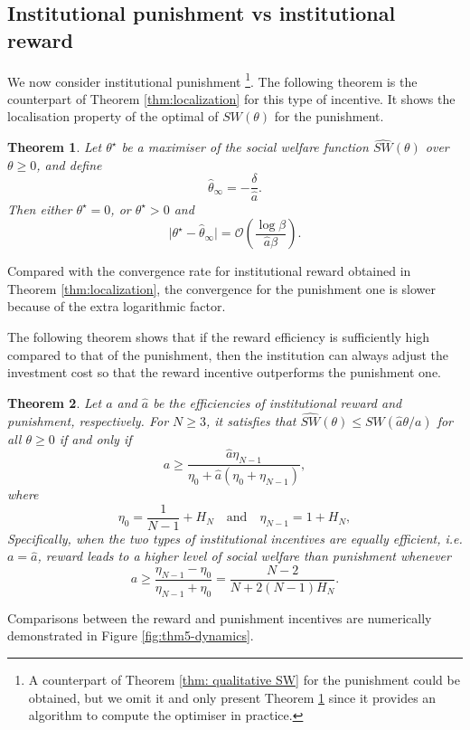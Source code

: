 \documentclass{article}
\newtheorem{theorem}{Theorem}
\begin{document}
\subsection{Institutional punishment vs institutional reward}
We now consider institutional punishment \footnote{A counterpart of Theorem \ref{thm: qualitative SW} for the punishment could be obtained, but we omit it and only present Theorem \ref{thm:localization_p} since it provides an algorithm to compute the optimiser in practice.}.
The following theorem is the counterpart of Theorem \ref{thm:localization} for this type of incentive. It shows the localisation property of the optimal of $SW(\theta)$ for the punishment.
\begin{theorem}
\label{thm:localization_p}
Let $\theta^\star$ be a maximiser of the social welfare function  $\widehat{SW}(\theta)$ over $\theta \ge 0$, and define
\[
\hat{\theta}_\infty = -\frac{\delta}{\hat{a}}.
\]
Then either $\theta^\star = 0$, or $\theta^\star>0$ and
\[
\bigl|\theta^\star - \hat{\theta}_\infty\bigr| = \mathcal{O}\!\left(\frac{\log \beta}{\hat{a}\beta}\right).
\]
\end{theorem}
Compared with the convergence rate for institutional  reward  obtained in Theorem \ref{thm:localization}, the convergence for the punishment one is  slower because of the extra logarithmic factor.

The following theorem shows that if the reward efficiency is sufficiently high compared to that of the punishment, then the institution can always adjust the investment cost so that the reward incentive outperforms the punishment one.\\

\begin{theorem} \label{thm:eff}
Let $a$ and $\hat{a}$ be the efficiencies of  institutional reward and punishment, respectively. For $N \ge 3$, it satisfies that $\widehat{SW}(\theta) \le SW(\hat{a}\theta/a)$ for all $\theta \ge 0$ if and only if 
\[
a \ge \frac{\hat{a} \eta_{N-1}}{\eta_0 + \hat{a}(\eta_0 + \eta_{N-1})},
\]
where 
\[
\eta_0 = \frac{1}{N-1} + H_{N}\quad \text{and}\quad
    \eta_{N-1} = 1 + H_{N},
\]   
Specifically, when the two types of institutional incentives are equally efficient, i.e. $a = \hat{a}$, reward leads to a higher level of social welfare than punishment whenever 
\[
a \ge \frac{\eta_{N-1}-\eta_0}{\eta_{N-1}+\eta_0} = \frac{N-2}{N + 2(N-1)H_N}.
\]
\end{theorem}
Comparisons between the reward and punishment incentives are numerically demonstrated in Figure \ref{fig:thm5-dynamics}.
\end{document}
